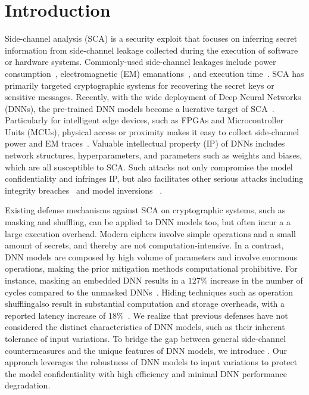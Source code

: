\section{Introduction}
Side-channel analysis (SCA) is a security exploit that focuses on inferring secret information from side-channel leakage collected during the execution of software or hardware systems.
Commonly-used side-channel leakages include power consumption~\cite{wei2018know, xiang2020open, randolph2020power}, electromagnetic (EM) emanations~\cite{kasper2009side, longo2015soc}, and execution time~\cite{jiang2017novel, zhang2016cloudradar}.
SCA  has primarily targeted %
cryptographic systems for recovering the secret keys or sensitive messages. 
Recently, with the wide deployment of Deep Neural Networks (DNNs), the pre-trained DNN models become a lucrative target of SCA~\cite{batina2019csi, xiang2020open,  ding2023emshepherd, wei2020leaky}.
Particularly for intelligent edge devices, such as FPGAs and Microcontroller Units (MCUs), physical access or proximity makes it easy to collect side-channel power and EM traces~\cite{batina2019csi, gongye2023side}.
Valuable intellectual property (IP) of DNNs includes network structures, hyperparameters, and parameters such as weights and biases, which are all susceptible to SCA. Such attacks not only compromise the model confidentiality and infringes IP, but also facilitates other serious attacks including integrity breaches~\cite{madry2017towards, tramer2020adaptive, rakin2019bit} and model inversions ~\cite{rakin2022deepsteal, dmitrenko2018dnn}.

Existing defense mechanisms against SCA on cryptographic systems, such as masking and shuffling, can be applied to DNN models too, but often incur a a large execution overhead.
Modern ciphers involve simple operations and a small amount of secrets, and thereby are not computation-intensive.  
In a contrast, DNN models are composed by high volume of parameters and involve enormous operations, making the prior mitigation methods computational prohibitive. %
For instance, %
masking an embedded DNN results in a $127\%$ increase in the number of cycles compared to the unmasked DNNs~\cite{dubey2020maskednet}.
Hiding techniques such as operation shufflingalso result in substantial computation and storage overheads, with a reported latency increase of $18\%$~\cite{brosch2022counteract}.
We realize that previous defenses have not considered the distinct characteristics of DNN models, such as their inherent tolerance of input variations. 
To bridge the gap between general side-channel countermeasures and the unique features of DNN models, we introduce \method.
Our approach leverages the robustness of DNN models to input variations to protect the model confidentiality with high efficiency and minimal DNN performance degradation.

